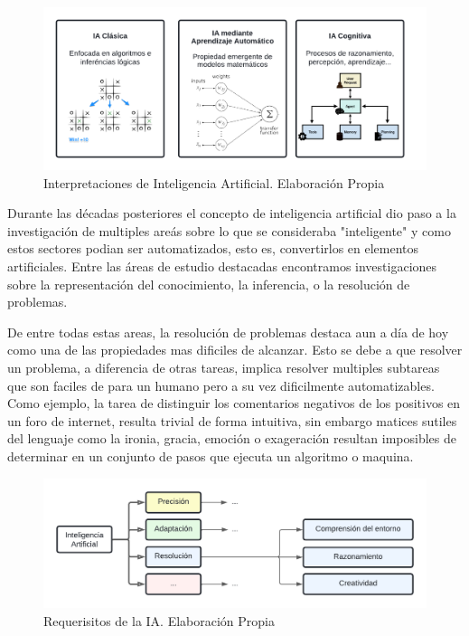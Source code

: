 \begin{itemize}
\begin{figure}[!hbp]
    \centering
    \includegraphics[scale=0.3, trim=0.5cm 0.5cm 0.5cm 0.5cm]{figs/AI-interpretations.png}
    \caption{\small Interpretaciones de Inteligencia Artificial. Elaboración Propia}
    \label{fig:etiqueta}
\end{figure}

\end{itemize}


Durante las décadas posteriores el concepto de inteligencia artificial dio paso a
la investigación de multiples areás sobre lo que se consideraba "inteligente" y como 
estos sectores podian ser automatizados, esto es, convertirlos en elementos artificiales.
Entre las áreas de estudio destacadas encontramos investigaciones sobre la representación
del conocimiento, la inferencia, o la resolución de problemas.

De entre todas estas areas, la resolución de problemas destaca aun a día de hoy
como una de las propiedades mas dificiles de alcanzar. Esto se debe a que
resolver un problema, a diferencia de otras tareas, implica resolver multiples
subtareas que son faciles de para un humano pero a su vez dificilmente
automatizables. Como ejemplo, la tarea de distinguir los comentarios negativos
de los positivos en un foro de internet, resulta trivial de forma intuitiva, sin
embargo matices sutiles del lenguaje como la ironia, gracia, emoción o
exageración resultan imposibles de determinar en un conjunto de pasos que
ejecuta un algoritmo o maquina.

\begin{figure}[!hbp]
    \centering
    \includegraphics[scale=0.3, trim=0.5cm 0.5cm 0.5cm 0.5cm]{figs/AI-properties.png}
    \caption{\small Requerisitos de la IA. Elaboración Propia}
    \label{fig:etiqueta}
\end{figure}

